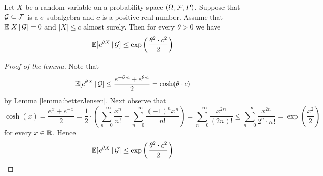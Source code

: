 \begin{lemma}\label{lemma:mainAzuma}
Let $X$ be a random variable on a probability space $\left(\Omega, {\mathcal F}, P\right)$. Suppose that ${\mathcal G}\subseteq {\mathcal F}$ is a $\sigma$-subalgebra and $c$ is a positive real number. Assume that ${\mathbb E}[X\,|\,{\mathcal G}]=0$ and $|X|\leq c$ almost surely. Then for every $\theta >0$ we have
$${\mathbb E} [e^{\theta X}\,|\,{\mathcal G}]\leq \exp\left(\frac{\theta^2\cdot c^2}{2}\right)$$
\end{lemma}
\begin{proof}[Proof of the lemma]
Note that 
$${\mathbb E} [e^{\theta X}\,|\,{\mathcal G}]\leq \frac{e^{-\theta \cdot c}+e^{\theta\cdot c}}{2} = \cosh(\theta \cdot c)$$
by Lemma \ref{lemma:betterJensen}. Next observe that
$$\cosh(x)= \frac{e^x + e^{-x}}{2}=\frac{1}{2}\cdot \left(\sum_{n=0}^{+\infty}\frac{x^n}{n!}+\sum_{n=0}^{+\infty}\frac{(-1)^nx^n}{n!}\right)=\sum_{n=0}^{+\infty}\frac{x^{2n}}{(2n)!}\leq \sum_{n=0}^{+\infty}\frac{x^{2n}}{2^n\cdot n!}=\exp\left(\frac{x^2}{2}\right)$$
for every $x\in {\mathbb R}$. Hence
$${\mathbb E} [e^{\theta X}\,|\,{\mathcal G}] \leq \exp\left(\frac{\theta^2\cdot c^2}{2}\right)$$
\end{proof}

